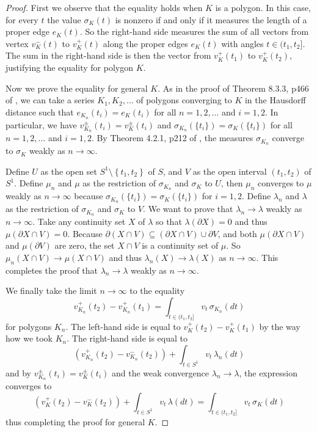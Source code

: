 \begin{proof}
First we observe that the equality holds when \(K\) is a polygon. In this case, for every \(t\) the value \(\sigma_K(t)\) is nonzero if and only if it measures the length of a proper edge \(e_K(t)\). So the right-hand side measures the sum of all vectors from vertex \(v_K^-(t)\) to \(v_K^+(t)\) along the proper edges \(e_K(t)\) with angles \(t \in (t_1, t_2]\). The sum in the right-hand side is then the vector from \(v_K^+(t_1)\) to \(v_K^+(t_2)\), justifying the equality for polygon \(K\).

Now we prove the equality for general \(K\). As in the proof of Theorem 8.3.3, p466 of \cite{schneider_2013}, we can take a series \(K_1, K_2, \dots\) of polygons converging to \(K\) in the Hausdorff distance such that \(e_{K_n}(t_i) = e_{K}(t_i)\) for all \(n = 1, 2, \dots\) and \(i = 1, 2\). In particular, we have \(v_{K_n}^{\pm}(t_i) = v_{K}^{\pm}(t_i)\) and \(\sigma_{K_n}(\{t_i\}) = \sigma_{K}(\{t_i\})\) for all \(n = 1, 2, \dots\) and \(i = 1, 2\). By Theorem 4.2.1, p212 of \cite{schneider_2013}, the measures \(\sigma_{K_n}\) converge to \(\sigma_K\) weakly as \(n \to \infty\).

Define \(U\) as the open set \(S^1 \setminus \left\{ t_1, t_2 \right\}\) of \(S\), and \(V\) as the open interval \((t_1, t_2)\) of \(S^1\). Define \(\mu_n\) and \(\mu\) as the restriction of \(\sigma_{K_n}\) and \(\sigma_K\) to \(U\), then \(\mu_n\) converges to \(\mu\) weakly as \(n \to \infty\) because \(\sigma_{K_n}(\{t_i\}) = \sigma_{K}(\{t_i\})\) for \(i = 1, 2\). Define \(\lambda_n\) and \(\lambda\) as the restriction of \(\sigma_{K_n}\) and \(\sigma_K\) to \(V\). We want to prove that \(\lambda_n \to \lambda\) weakly as \(n \to \infty\). Take any continuity set \(X\) of \(\lambda\) so that \(\lambda(\partial X) = 0\) and thus \(\mu(\partial X \cap V) = 0\). Because \(\partial(X \cap V) \subseteq (\partial X \cap V) \cup \partial V\), and both \(\mu(\partial X \cap V)\) and \(\mu(\partial V)\) are zero, the set \(X \cap V\) is a continuity set of \(\mu\). So \(\mu_n(X \cap V) \to \mu(X \cap V)\) and thus \(\lambda_n(X) \to \lambda(X)\) as \(n \to \infty\). This completes the proof that \(\lambda_n \to \lambda\) weakly as \(n \to \infty\).

We finally take the limit \(n \to \infty\) to the equality
\[
v_{K_n}^+(t_2) - v_{K_n}^+(t_1) = \int_{t \in (t_1, t_2]} v_t \, \sigma_{K_n}(dt)
\]
for polygons \(K_n\). The left-hand side is equal to \(v_K^+(t_2) - v_K^+(t_1)\) by the way how we took \(K_n\). The right-hand side is equal to
\[
(v_{K_n}^+(t_2) - v_{K_n}^-(t_2)) + \int_{t \in S^1} v_t \, \lambda_n(dt)
\]
and by \(v_{K_n}^{\pm}(t_i) = v_{K}^{\pm}(t_i)\) and the weak convergence \(\lambda_n \to \lambda\), the expression converges to
\[
(v_{K}^+(t_2) - v_{K}^-(t_2)) + \int_{t \in S^1} v_t \, \lambda(dt) = \int_{t \in (t_1, t_2]} v_t\, \sigma_{K}(dt)
\]
thus completing the proof for general \(K\).
\end{proof}

